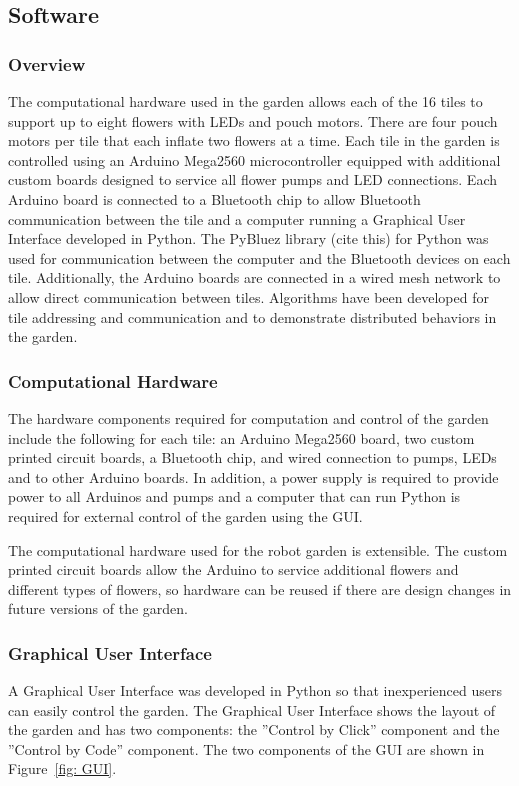 \documentclass[letterpaper, 10 pt, conference]{ieeeconf}  %
\begin{document}
\subsection{\textbf{Software}}

\subsubsection{\textbf{Overview}} 
The computational hardware used in the garden allows each of the 16 tiles to support up to eight flowers with LEDs and pouch motors.  There are four pouch motors per tile that each inflate two flowers at a time.  Each tile in the garden is controlled using an Arduino Mega2560 microcontroller equipped with additional custom boards designed to service all flower pumps and LED connections.  Each Arduino board is connected to a Bluetooth chip to allow Bluetooth communication between the tile and a computer running a Graphical User Interface developed in Python.  The PyBluez library (cite this) for Python was used for communication between the computer and the Bluetooth devices on each tile.  Additionally, the Arduino boards are connected in a wired mesh network to allow direct communication between tiles.  Algorithms have been developed for tile addressing and communication and to demonstrate distributed behaviors in the garden.
\subsubsection{\textbf{Computational Hardware}} 
The hardware components required for computation and control of the garden include the following for each tile: an Arduino Mega2560 board, two custom printed circuit boards, a Bluetooth chip, and wired connection to pumps, LEDs and to other Arduino boards.  In addition, a power supply is required to provide power to all Arduinos and pumps and a computer that can run Python is required for external control of the garden using the GUI.

The computational hardware used for the robot garden is extensible. The custom printed circuit boards allow the Arduino to service additional flowers and different types of flowers, so hardware can be reused if there are design changes in future versions of the garden.

\subsubsection{\textbf{Graphical User Interface}}
A Graphical User Interface was developed in Python so that inexperienced users can easily control the garden.  The Graphical User Interface shows the layout of the garden and has two components: the ''Control by Click'' component and the ''Control by Code'' component.  The two components of the GUI are shown in Figure~\ref{fig: GUI}.
\end{document}
